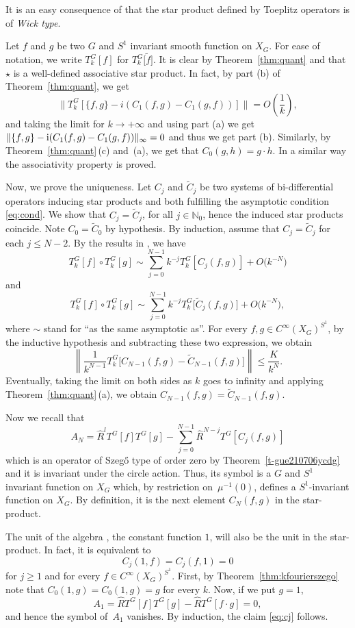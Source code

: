 \documentclass[pdftex]{sigma}
\numberwithin{equation}{section}
\begin{document}
 	It is an easy consequence of \cite{gh} that the star product defined by Toeplitz operators is of \textit{Wick type}.
 	
 	Let $f$ and $g$ be two $G$ and $S^1$ invariant smooth function on $X_G$. For ease of notation, we write $T^{G}_k[f]$ for $T^{G}_k\big[\widetilde{f}\big]$. It is clear by Theorem~\ref{thm:quant} and \cite{gh} that $\star$ is a well-defined associative star product. In fact, by part (b) of Theorem~\ref{thm:quant}, we get
 	\[\big\lVert T^{G}_k[{\{f, g\}-i(C_1(f,g)-C_1(g,f))}] \big\rVert=O\left(\frac{1}{k}\right), \]
 	and taking the limit for $k\rightarrow+\infty$ and using part (a) we get
$\lVert \{f, g\}-{\rm i}(C_1(f,g)-C_1(g,f))\rVert_{\infty}=0 $
 	and thus we get part (b). Similarly, by Theorem~\ref{thm:quant}\,(c) and~(a), we get that $C_0(g,h)=g\cdot h$. In a similar way the associativity property is proved. 	
 	
 	Now, we prove the uniqueness. Let $C_j$ and $\tilde{C}_j$ be two systems of bi-differential operators inducing star products and both fulfilling the asymptotic condition \eqref{eq:cond}. We show that $C_j = \tilde{C}_j$, for all $j\in \mathbb{N}_0$, hence the induced star products coincide. Note $C_0=\tilde{C}_0$ by hypothesis. By induction, assume that $C_j=\tilde{C}_j$ for each $j\leq N-2$. By the results in \cite{gh}, we have
 	\[T_k^G[f]\circ T_k^G[g]\sim\sum_{j=0}^{N-1}k^{-j}T_k^G[C_j(f, g)] +O\bigl(k^{-N}\bigr)\]
 	and
 	\[T_k^G[f]\circ T_k^G[g]\sim\sum_{j=0}^{N-1}k^{-j}T_k^G\big[\tilde{C}_j(f, g)\big]+O\bigl(k^{-N}\bigr) , \]
 	where $\sim$ stand for ``as the same asymptotic as''. For every $f, g\in C^{\infty}(X_G)^{S^1}$, by the inductive hypothesis and subtracting these two expression, we obtain
 	\[\left\lVert \frac{1}{k^{N-1}} T^G_k\big[{C}_{N-1}(f, g)-\tilde{C}_{N-1}(f, g)\big]\right\rVert\leq \frac{K}{k^{N}} . \]
 	Eventually, taking the limit on both sides as $k$ goes to infinity and applying Theorem~\ref{thm:quant}\,(a), we obtain
 	$C_{N-1}(f, g)=\tilde{C}_{N-1}(f, g) $.
 	
 	Now we recall that
 	\[A_N=\hat{R}^lT^G[f]T^G[g]-\sum_{j=0}^{N-1} \hat{R}^{N-j}T^G[C_j(f, g)] \]
 	which is an operator of Szeg\H{o} type of order zero by Theorem~\ref{t-gue210706ycdg} and it is invariant under the circle action. Thus, its symbol is a $G$ and $S^1$ invariant function on $X_G$ which, by restriction on~$\mu^{-1}(0)$, defines a $S^1$-invariant function on $X_G$. By definition, it is the next element $C_N(f, g)$ in the star-product.
 	
 	The unit of the algebra , the constant function $1$, will also be the unit in the star-product. In fact, it is equivalent to
 	\begin{equation} \label{eq:cj}
 		C_j(1, f)=C_j(f, 1)=0
 		\end{equation}
 	for $j\geq 1$ and for every $f\in C^{\infty}(X_G)^{S^1}$. First, by Theorem~\ref{thm:kfourierszego} note that
 	$ C_0(1, g)=C_0(1, g)=g$
 	for every $k$. 	Now, if we put $g=1$,{\samepage
\[
A_1= \hat{R}T^G[f]T^G[g]-\hat{R}T^G[f\cdot g]= 0,
\]
 	and hence the symbol of~$A_1$ vanishes. By induction, the claim \eqref{eq:cj} follows.}
 	
\end{document}
